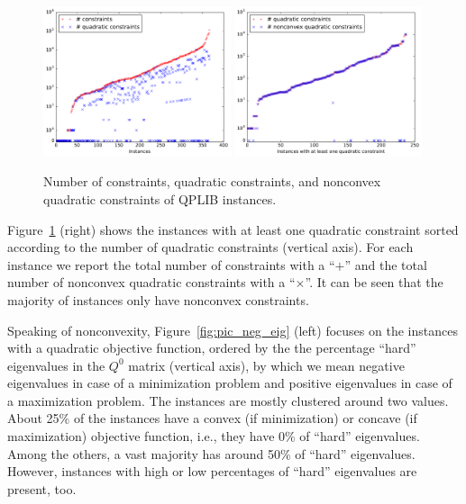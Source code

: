 \begin{figure}\centering
  \includegraphics[width=0.49\textwidth]{pic_constr.pdf}
  \includegraphics[width=0.49\textwidth]{pic_quad_conv_vs_nonconv.pdf}
  \caption{Number of constraints, quadratic constraints, and nonconvex quadratic constraints of QPLIB instances. \label{fig:pic_constr}}
\end{figure}

Figure~\ref{fig:pic_constr} (right) shows the instances with at least one quadratic constraint sorted according to the number of quadratic constraints (vertical axis). For each instance we report the total number of constraints with a ``$+$''
and the total number of nonconvex quadratic constraints
with a ``$\times$''.
It can be seen that the majority of instances only have nonconvex constraints. %





Speaking of nonconvexity, Figure~\ref{fig:pic_neg_eig} (left) focuses on
the instances with a quadratic objective function, ordered by the
the percentage ``hard'' eigenvalues in the $Q^0$ matrix (vertical axis), by which
we mean negative eigenvalues in case of a minimization problem and positive eigenvalues in case of a maximization problem.
The instances are mostly clustered around two values. About 25\% of the instances have a convex (if minimization) or concave (if maximization) objective function,
i.e., they have 0\% of ``hard'' eigenvalues. Among the others, a vast
majority has around 50\% of ``hard'' eigenvalues. However, instances
with high or low percentages of ``hard'' eigenvalues are present, too.

